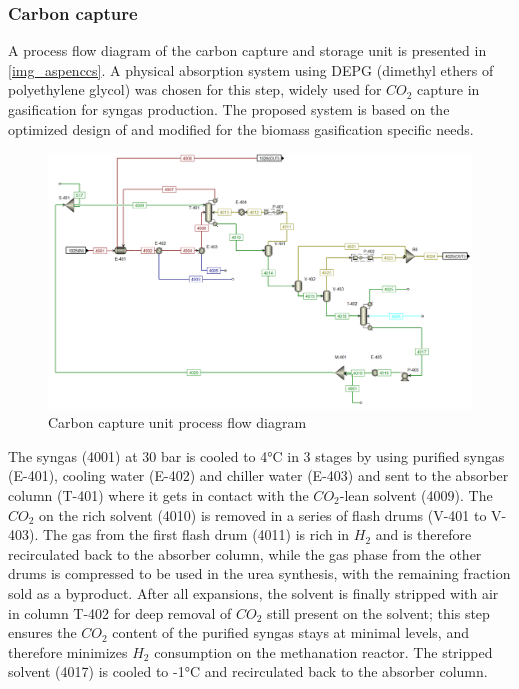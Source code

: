 \documentclass[a4paper, titlepage]{article}
\begin{document}
\subsubsection{Carbon capture}

A process flow diagram of the carbon capture and storage unit is presented in \autoref{img_aspenccs}.
A physical absorption system using DEPG (dimethyl ethers of polyethylene  glycol) was chosen for this step, widely
used for $CO_2$ capture in gasification for syngas production. The proposed system is based on the optimized design
of \textcite{martelliMultiobjectiveOptimizationSelexol2015} and modified for the biomass gasification specific needs. 

\begin{figure}
	\includegraphics[width=\textwidth]{img/aspen_ccs.png}
	\caption{Carbon capture unit process flow diagram}
	\label{img_aspenccs}
\end{figure}

The syngas (4001) at 30 bar is cooled to 4°C in 3 stages by using purified syngas (E-401), cooling water (E-402) and
chiller water (E-403) and sent to the absorber column (T-401) where it gets in contact with the $CO_2$-lean 
solvent (4009). The $CO_2$ on the rich solvent (4010) is removed in a series of flash drums (V-401 to V-403). 
The gas from the first flash drum (4011) is rich in $H_2$ and is therefore recirculated back to the absorber column,
while the gas phase from the other drums is compressed to be used in the urea synthesis, with the remaining fraction sold as a byproduct. After all expansions, the solvent is finally stripped with air \cite{mokhatabNaturalGasSweetening2012} 
in column T-402 for deep removal of $CO_2$ still present on the solvent; this step ensures the $CO_2$ content of the 
purified syngas stays at minimal levels, and therefore minimizes $H_2$ consumption on the methanation reactor. 
The stripped solvent (4017) is cooled to -1°C and recirculated back to the absorber column.
\end{document}
